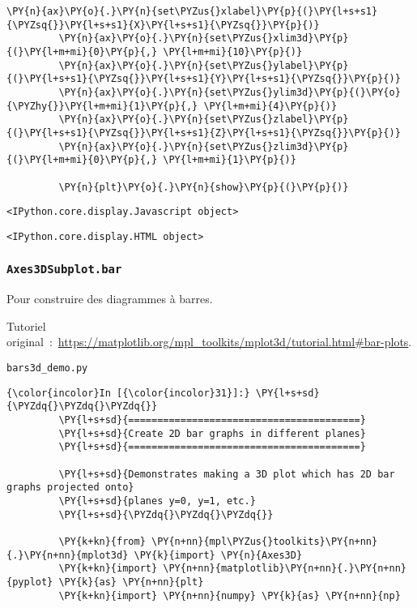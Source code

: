 \begin{Verbatim}[commandchars=\\\{\},frame=single,framerule=0.3mm,rulecolor=\color{cellframecolor}]
         \PY{n}{ax}\PY{o}{.}\PY{n}{set\PYZus{}xlabel}\PY{p}{(}\PY{l+s+s1}{\PYZsq{}}\PY{l+s+s1}{X}\PY{l+s+s1}{\PYZsq{}}\PY{p}{)}
         \PY{n}{ax}\PY{o}{.}\PY{n}{set\PYZus{}xlim3d}\PY{p}{(}\PY{l+m+mi}{0}\PY{p}{,} \PY{l+m+mi}{10}\PY{p}{)}
         \PY{n}{ax}\PY{o}{.}\PY{n}{set\PYZus{}ylabel}\PY{p}{(}\PY{l+s+s1}{\PYZsq{}}\PY{l+s+s1}{Y}\PY{l+s+s1}{\PYZsq{}}\PY{p}{)}
         \PY{n}{ax}\PY{o}{.}\PY{n}{set\PYZus{}ylim3d}\PY{p}{(}\PY{o}{\PYZhy{}}\PY{l+m+mi}{1}\PY{p}{,} \PY{l+m+mi}{4}\PY{p}{)}
         \PY{n}{ax}\PY{o}{.}\PY{n}{set\PYZus{}zlabel}\PY{p}{(}\PY{l+s+s1}{\PYZsq{}}\PY{l+s+s1}{Z}\PY{l+s+s1}{\PYZsq{}}\PY{p}{)}
         \PY{n}{ax}\PY{o}{.}\PY{n}{set\PYZus{}zlim3d}\PY{p}{(}\PY{l+m+mi}{0}\PY{p}{,} \PY{l+m+mi}{1}\PY{p}{)}
         
         \PY{n}{plt}\PY{o}{.}\PY{n}{show}\PY{p}{(}\PY{p}{)}
\end{Verbatim}


    
    \begin{verbatim}
<IPython.core.display.Javascript object>
    \end{verbatim}

    
    
    \begin{verbatim}
<IPython.core.display.HTML object>
    \end{verbatim}

    
    \hypertarget{axes3dsubplot.bar}{%
\subsubsection{\texorpdfstring{\texttt{Axes3DSubplot.bar}}{Axes3DSubplot.bar}}\label{axes3dsubplot.bar}}

    Pour construire des diagrammes à barres.

    Tutoriel
original~:~\url{https://matplotlib.org/mpl_toolkits/mplot3d/tutorial.html\#bar-plots}.

    \texttt{bars3d\_demo.py}

    \begin{Verbatim}[commandchars=\\\{\},frame=single,framerule=0.3mm,rulecolor=\color{cellframecolor}]
{\color{incolor}In [{\color{incolor}31}]:} \PY{l+s+sd}{\PYZdq{}\PYZdq{}\PYZdq{}}
         \PY{l+s+sd}{========================================}
         \PY{l+s+sd}{Create 2D bar graphs in different planes}
         \PY{l+s+sd}{========================================}
         
         \PY{l+s+sd}{Demonstrates making a 3D plot which has 2D bar graphs projected onto}
         \PY{l+s+sd}{planes y=0, y=1, etc.}
         \PY{l+s+sd}{\PYZdq{}\PYZdq{}\PYZdq{}}
         
         \PY{k+kn}{from} \PY{n+nn}{mpl\PYZus{}toolkits}\PY{n+nn}{.}\PY{n+nn}{mplot3d} \PY{k}{import} \PY{n}{Axes3D}
         \PY{k+kn}{import} \PY{n+nn}{matplotlib}\PY{n+nn}{.}\PY{n+nn}{pyplot} \PY{k}{as} \PY{n+nn}{plt}
         \PY{k+kn}{import} \PY{n+nn}{numpy} \PY{k}{as} \PY{n+nn}{np}
\end{Verbatim}


